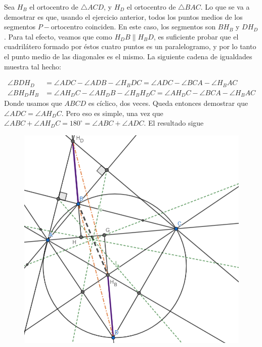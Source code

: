 \begin{sol}
	
	Sea $H_{B}$ el ortocentro de $\triangle ACD$, y $H_{D}$ el ortocentro de $\triangle BAC$. Lo que se va a demostrar es que, usando el ejercicio anterior, todos los puntos medios de los segmentos $P-$ortocentro coinciden. En este caso, los segmentos son $BH_{B}$ y $DH_{D}$. Para tal efecto, veamos que como $H_{D}B \parallel H_{B}D$, es suficiente probar que el cuadril\'atero formado por \'estos cuatro puntos es un paralelogramo, y por lo tanto el punto medio de las diagonales es el mismo. La siguiente cadena de igualdades muestra tal hecho: 
	
	\begin{align}
	\angle BDH_{D} &= \angle ADC - \angle ADB - \angle H_{B}DC = \angle ADC - \angle BCA - \angle H_{B}AC \\
	\angle BH_{D}H_{B} &= \angle AH_{D}C - \angle AH_{D}B - \angle H_{B}H_{D}C = \angle AH_{D}C -\angle BCA - \angle H_{B}AC
	\end{align}
	 Donde usamos que $ABCD$ es c\'iclico, dos veces. Queda entonces demostrar que $\angle ADC = \angle AH_{D}C$. Pero eso es simple, una vez que $\angle ABC + \angle AH_{D}C = 180^{\circ} = \angle ABC + \angle ADC$. El resultado sigue
	 
	 \begin{figure}[h!]
	 	\centering
	 	\includegraphics[scale=0.4]{Imgs/JT7.png}
	 \end{figure}
	 
\end{sol}

